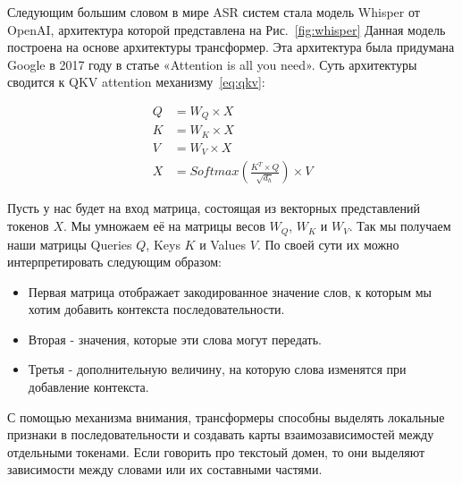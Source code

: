 Следующим большим словом в мире ASR систем стала модель Whisper от OpenAI, архитектура которой представлена на Рис.~\ref{fig:whisper}
Данная модель построена на основе архитектуры трансформер.
Эта архитектура была придумана Google в 2017 году в статье «Attention is all you need».
Суть архитектуры сводится к QKV attention механизму~\ref{eq:qkv}:

\begin{equation}
  \begin{aligned}
    Q &= W_Q \times X \\
    K &= W_K \times X \\
    V &= W_V \times X \\
    X &= Softmax(\frac{K^T \times Q}{\sqrt{d_h}}) \times V
  \end{aligned}
  \label{eq:qkv}
\end{equation}

Пусть у нас будет на вход матрица, состоящая из векторных представлений токенов $X$.
Мы умножаем её на матрицы весов $W_Q$, $W_K$ и $W_V$.
Так мы получаем наши матрицы Queries $Q$, Keys $K$ и Values $V$.
По своей сути их можно интерпретировать следующим образом:
\begin{itemize}
  \item Первая матрица отображает закодированное значение слов, к которым мы хотим добавить контекста последовательности.
  \item Вторая - значения, которые эти слова могут передать.
  \item Третья - дополнительную величину, на которую слова изменятся при добавление контекста.
\end{itemize} 

С помощью механизма внимания, трансформеры способны выделять локальные признаки в последовательности и создавать карты взаимозависимостей между отдельными токенами.
Если говорить про текстоый домен, то они выделяют зависимости между словами или их составными частями.

